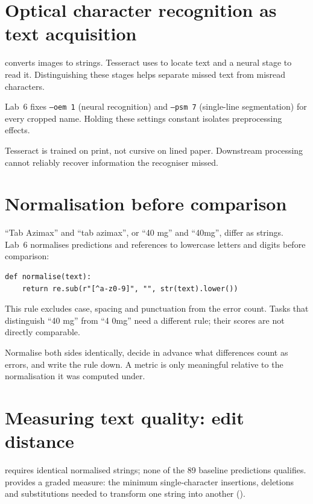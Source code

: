 \section{Optical character recognition as text acquisition}

 converts images to strings. Tesseract uses  to locate text and a neural  stage to read it. Distinguishing these stages helps separate missed text from misread characters.

Lab~6 fixes \texttt{--oem 1} (neural recognition) and \texttt{--psm 7} (single-line segmentation) for every cropped name. Holding these settings constant isolates preprocessing effects.

\begin{intuition}
Tesseract is trained on print, not cursive on lined paper. Downstream processing cannot reliably recover information the recogniser missed.
\end{intuition}

\section{Normalisation before comparison}

``Tab Azimax'' and ``tab azimax'', or ``40 mg'' and ``40mg'', differ as strings. Lab~6 normalises predictions and references to lowercase letters and digits before comparison:

\begin{lstlisting}[style=utppython]
def normalise(text):
    return re.sub(r"[^a-z0-9]", "", str(text).lower())
\end{lstlisting}

This rule excludes case, spacing and punctuation from the error count. Tasks that distinguish ``40 mg'' from ``4 0mg'' need a different rule; their scores are not directly comparable.

\begin{keyidea}
Normalise both sides identically, decide in advance what differences count as errors, and write the rule down. A metric is only meaningful relative to the normalisation it was computed under.
\end{keyidea}

\section{Measuring text quality: edit distance}

 requires identical normalised strings; none of the 89 baseline predictions qualifies.  provides a graded measure: the minimum single-character insertions, deletions and substitutions needed to transform one string into another ().

